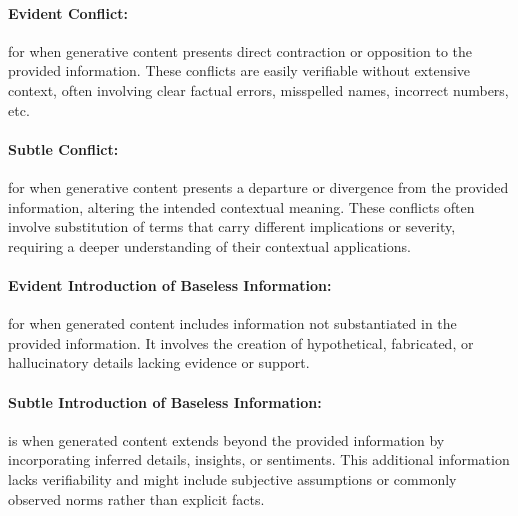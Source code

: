 \documentclass[11pt]{article}
\begin{document}
\paragraph{Evident Conflict:} for when generative content presents direct contraction or opposition to the provided information. These conflicts are easily verifiable without extensive context, often involving clear factual errors, misspelled names, incorrect numbers, etc.

\paragraph{Subtle Conflict:} for when generative content presents a departure or divergence from the provided information, altering the intended contextual meaning. These conflicts often involve substitution of terms that carry different implications or severity, requiring a deeper understanding of their contextual applications. 

\paragraph{Evident Introduction of Baseless Information:} for when generated content includes information not substantiated in the provided information. It involves the creation of hypothetical, fabricated, or hallucinatory details lacking evidence or support. 

\paragraph{Subtle Introduction of Baseless Information:} is when generated content extends beyond the provided information by incorporating inferred details, insights, or sentiments. This additional information lacks verifiability and might include subjective assumptions or commonly observed norms rather than explicit facts. 
\end{document}
